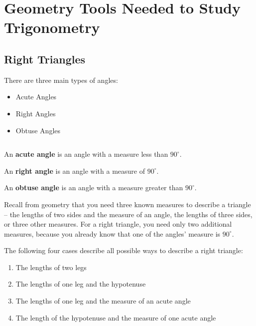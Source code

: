\chapter{Geometry Tools Needed to Study Trigonometry}
\label{chap:geometry_tools_needed_to_study_trigonometry}

\section{Right Triangles}
\label{sec:right_triangles}

There are three main types of angles:

\begin{itemize}
	\label{item:three_main_types_of_angles}

	\item Acute Angles
	\item Right Angles
	\item Obtuse Angles
\end{itemize}

\begin{definition}[Angles]
	\label{def:angles}$ $

	An \textbf{acute angle} is an angle with a measure less than $90^{\circ}$.

	An \textbf{right angle} is an angle with a measure of $90^{\circ}$.

	An \textbf{obtuse angle} is an angle with a measure greater than
	$90^{\circ}$.
\end{definition}

Recall from geometry that you need three known measures to describe a triangle
-- the lengths of two sides and the measure of an angle, the lengths of three
sides, or three other measures. For a right triangle, you need only two
additional measures, because you already know that one of the angles' measure
is $90^{\circ}$.

The following four cases describe all possible ways to describe a right triangle:

\begin{enumerate}
	\label{enum:four_ways_to_describe_a_right_triangle}

	\item The lengths of two legs
	\item The lengths of one leg and the hypotenuse
	\item The lengths of one leg and the measure of an acute angle
	\item The length of the hypotenuse and the measure of one acute angle
\end{enumerate}

